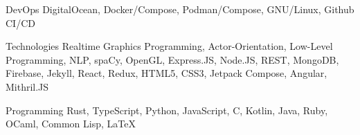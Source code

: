 

\begin{cvskills}

  \cvskill
    {DevOps} %
    {DigitalOcean, Docker/Compose, Podman/Compose, GNU/Linux, Github CI/CD} %

  \cvskill
    {Technologies} %
    {Realtime Graphics Programming, Actor-Orientation, Low-Level Programming, NLP, spaCy, OpenGL, Express.JS, Node.JS, REST, MongoDB, Firebase, Jekyll, React, Redux, HTML5, CSS3, Jetpack Compose, Angular, Mithril.JS} %

  \cvskill
    {Programming} %
    {Rust, TypeScript, Python, JavaScript, C, Kotlin, Java, Ruby, OCaml, Common Lisp, LaTeX} %

\end{cvskills}

